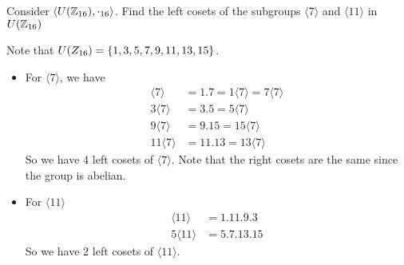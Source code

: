 \begin{exercise}
    Consider $\langle U \qty(\mathbb{Z}_{16}), \cdot_{16} \rangle$. Find the left cosets of the subgroups $\langle 7 \rangle$ and $\langle 11 \rangle$ in $U \qty(\mathbb{Z}_{16})$
\end{exercise}

\begin{solution}
    Note that $U \qty(Z_{16}) = \qty{1, 3, 5, 7, 9, 11, 13, 15}$. 
    \begin{itemize}
        \item For $\langle 7 \rangle$, we have
        \begin{align*}
            \langle 7 \rangle &= \qty{1, 7} = 1 \langle 7 \rangle = 7 \langle 7 \rangle \\
            3 \langle 7 \rangle &= \qty{3, 5} = 5 \langle 7 \rangle \\
            9 \langle 7 \rangle &= \qty{9, 15} = 15 \langle 7 \rangle \\
            11 \langle 7 \rangle &= \qty{11, 13} = 13 \langle 7 \rangle 
        \end{align*}
        So we have 4 left cosets of $\langle 7 \rangle$. Note that the right cosets are the same since the group is abelian.
        \item For $\langle 11 \rangle$
        \begin{align*}
            \langle 11 \rangle &= \qty{1, 11, 9,  3} \\
            5 \langle 11 \rangle &= \qty{5, 7, 13, 15} 
        \end{align*}
        So we have 2 left cosets of $\langle 11 \rangle$.
    \end{itemize}
\end{solution}

